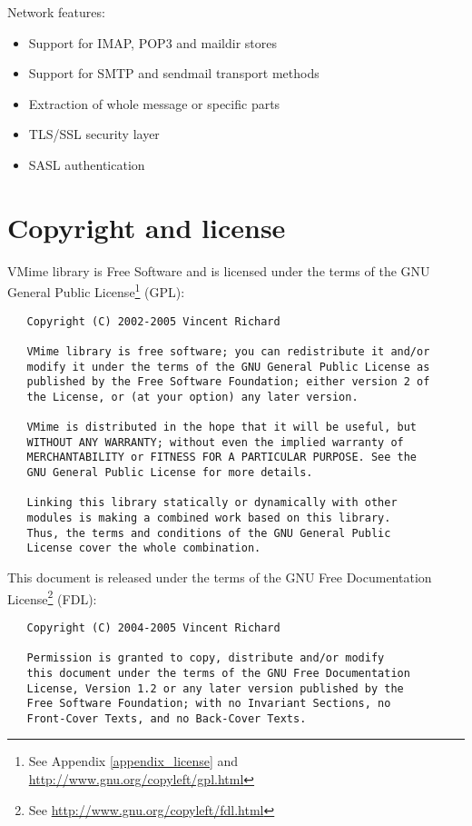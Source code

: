 \noindent Network features:

\begin{itemize}
\item Support for IMAP, POP3 and maildir stores
\item Support for SMTP and sendmail transport methods
\item Extraction of whole message or specific parts
\item TLS/SSL security layer
\item SASL authentication
\end{itemize}


\section{Copyright and license}

VMime library is Free Software and is licensed under the terms of the GNU
General Public License\footnote{See Appendix \ref{appendix_license} and
\url{http://www.gnu.org/copyleft/gpl.html}} (GPL):

\begin{verbatim}
   Copyright (C) 2002-2005 Vincent Richard

   VMime library is free software; you can redistribute it and/or
   modify it under the terms of the GNU General Public License as
   published by the Free Software Foundation; either version 2 of
   the License, or (at your option) any later version.

   VMime is distributed in the hope that it will be useful, but
   WITHOUT ANY WARRANTY; without even the implied warranty of
   MERCHANTABILITY or FITNESS FOR A PARTICULAR PURPOSE. See the
   GNU General Public License for more details.

   Linking this library statically or dynamically with other
   modules is making a combined work based on this library.
   Thus, the terms and conditions of the GNU General Public
   License cover the whole combination.
\end{verbatim}

\newpage
\noindent This document is released under the terms of the
GNU Free Documentation
License\footnote{See \url{http://www.gnu.org/copyleft/fdl.html}} (FDL):

\begin{verbatim}
   Copyright (C) 2004-2005 Vincent Richard

   Permission is granted to copy, distribute and/or modify
   this document under the terms of the GNU Free Documentation
   License, Version 1.2 or any later version published by the
   Free Software Foundation; with no Invariant Sections, no
   Front-Cover Texts, and no Back-Cover Texts.
\end{verbatim}

